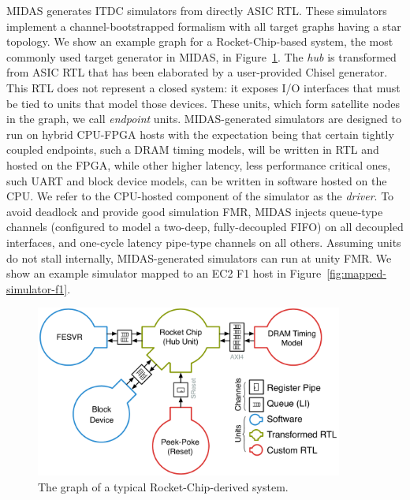 MIDAS generates ITDC simulators from directly ASIC RTL. These simulators
implement a channel-bootstrapped formalism with all target graphs having a
star topology. We show an example graph for a Rocket-Chip-based system, the
most commonly used target generator in MIDAS, in Figure~\ref{fig:rocket-target-graph}.
The \emph{hub} is transformed from ASIC RTL that has been elaborated by a user-provided Chisel
generator. This RTL does not represent a
closed system: it exposes I/O interfaces that must be tied to units that model those
devices. These units, which form satellite nodes in the graph, we call \emph{endpoint} units.
MIDAS-generated simulators are designed to run on hybrid CPU-FPGA hosts
with the expectation being that certain tightly coupled endpoints, such a DRAM
timing models, will be written in RTL and hosted on the FPGA, while other higher
latency, less performance critical ones, such UART and block device models, can
be written in software hosted on the CPU. We refer to the CPU-hosted component
of the simulator as the \emph{driver}. To avoid deadlock and provide good
simulation FMR, MIDAS injects queue-type channels (configured to model a two-deep,
fully-decoupled FIFO) on all decoupled interfaces, and one-cycle latency
pipe-type channels on all others. Assuming units do not stall internally, MIDAS-generated
simulators can run at unity FMR. We show an example simulator mapped to an EC2 F1 host in Figure~\ref{fig:mapped-simulator-f1}.

\begin{figure}
    \centering
    \includegraphics[width=0.9\textwidth]{figures/rocket-target-graph.pdf}
    \caption{The graph of a typical Rocket-Chip-derived system.}
    \label{fig:rocket-target-graph}
\end{figure}

